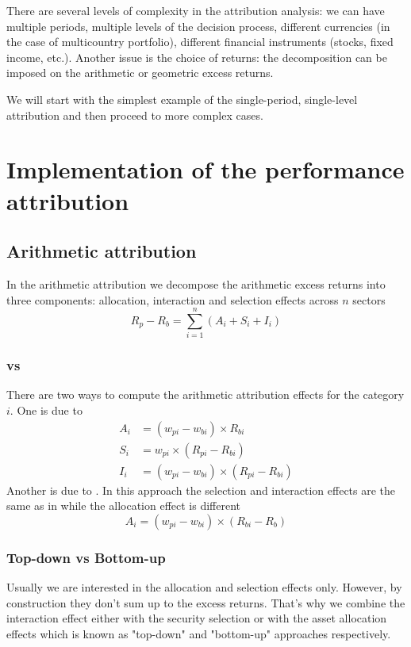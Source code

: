 \documentclass[11pt,a4paper]{article}
\begin{document}
There are several levels of complexity in the attribution analysis: we can have multiple periods, multiple levels of the decision process, different currencies (in the case of multicountry portfolio), different financial instruments (stocks, fixed income, etc.). Another issue is the choice of returns: the decomposition can be imposed on the arithmetic or geometric excess returns.

We will start with the simplest example of the single-period, single-level attribution and then proceed to more complex cases.

\section{Implementation of the performance attribution}
\subsection{Arithmetic attribution}
In the arithmetic attribution we decompose the arithmetic excess returns into three components: allocation, interaction and selection effects across $n$ sectors
\[
  R_{p}-R_{b}=\sum^{n}_{i=1}\left(A_{i}+S_{i}+I_{i}\right)
\]

\subsubsection{\cite{brinson1985measuring} vs \cite{brinson1986determinants}}
There are two ways to compute the arithmetic attribution effects for the category $i$. One is due to \cite{brinson1986determinants}
\[
  \begin{aligned}
    A_{i} & =(w_{pi}-w_{bi})\times R_{bi} \\
    S_{i} & = w_{pi}\times(R_{pi}-R_{bi}) \\
    I_{i} & = (w_{pi}-w_{bi})\times(R_{pi}-R_{bi})
  \end{aligned}
\]
Another is due to \cite{brinson1985measuring}. In this approach the selection and interaction effects are the same as in \cite{brinson1986determinants} while the allocation effect is different
\[
  A_i = (w_{pi} - w_{bi})\times (R_{bi} - R_b)
\]

\subsubsection{Top-down vs Bottom-up}
Usually we are interested in the allocation and selection effects only. However, by construction they don't sum up to the excess returns. That's why we combine the interaction effect either with the security selection or with the asset allocation effects which is known as "top-down" and "bottom-up" approaches respectively.
\end{document}
